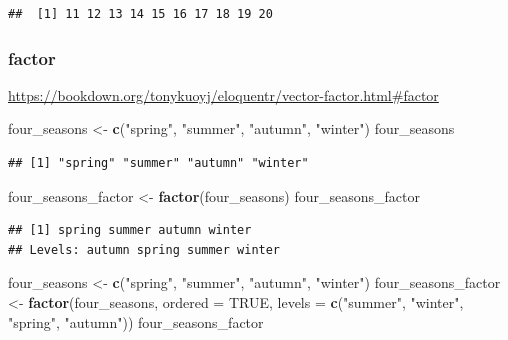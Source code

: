 \documentclass[
]{book}
\newenvironment{Shaded}{\begin{snugshade}}{\end{snugshade}}
\newcommand{\AttributeTok}[1]{\textcolor[rgb]{0.13,0.29,0.53}{#1}}
\newcommand{\ConstantTok}[1]{\textcolor[rgb]{0.56,0.35,0.01}{#1}}
\newcommand{\FunctionTok}[1]{\textcolor[rgb]{0.13,0.29,0.53}{\textbf{#1}}}
\newcommand{\NormalTok}[1]{#1}
\newcommand{\OtherTok}[1]{\textcolor[rgb]{0.56,0.35,0.01}{#1}}
\newcommand{\StringTok}[1]{\textcolor[rgb]{0.31,0.60,0.02}{#1}}
\theoremstyle{definition}
\theoremstyle{definition}
\theoremstyle{definition}
\theoremstyle{definition}
\theoremstyle{remark}
\begin{document}
\begin{verbatim}
##  [1] 11 12 13 14 15 16 17 18 19 20
\end{verbatim}

\hypertarget{factor}{%
\subsubsection{factor}\label{factor}}

\url{https://bookdown.org/tonykuoyj/eloquentr/vector-factor.html\#factor}

\begin{Shaded}
\begin{Highlighting}[]
\NormalTok{four\_seasons }\OtherTok{\textless{}{-}} \FunctionTok{c}\NormalTok{(}\StringTok{"spring"}\NormalTok{, }\StringTok{"summer"}\NormalTok{, }\StringTok{"autumn"}\NormalTok{, }\StringTok{"winter"}\NormalTok{)}
\NormalTok{four\_seasons}
\end{Highlighting}
\end{Shaded}

\begin{verbatim}
## [1] "spring" "summer" "autumn" "winter"
\end{verbatim}

\begin{Shaded}
\begin{Highlighting}[]
\NormalTok{four\_seasons\_factor }\OtherTok{\textless{}{-}} \FunctionTok{factor}\NormalTok{(four\_seasons)}
\NormalTok{four\_seasons\_factor}
\end{Highlighting}
\end{Shaded}

\begin{verbatim}
## [1] spring summer autumn winter
## Levels: autumn spring summer winter
\end{verbatim}

\begin{Shaded}
\begin{Highlighting}[]
\NormalTok{four\_seasons }\OtherTok{\textless{}{-}} \FunctionTok{c}\NormalTok{(}\StringTok{"spring"}\NormalTok{, }\StringTok{"summer"}\NormalTok{, }\StringTok{"autumn"}\NormalTok{, }\StringTok{"winter"}\NormalTok{)}
\NormalTok{four\_seasons\_factor }\OtherTok{\textless{}{-}} \FunctionTok{factor}\NormalTok{(four\_seasons, }\AttributeTok{ordered =} \ConstantTok{TRUE}\NormalTok{, }\AttributeTok{levels =} \FunctionTok{c}\NormalTok{(}\StringTok{"summer"}\NormalTok{, }\StringTok{"winter"}\NormalTok{, }\StringTok{"spring"}\NormalTok{, }\StringTok{"autumn"}\NormalTok{))}
\NormalTok{four\_seasons\_factor}
\end{Highlighting}
\end{Shaded}
\end{document}
